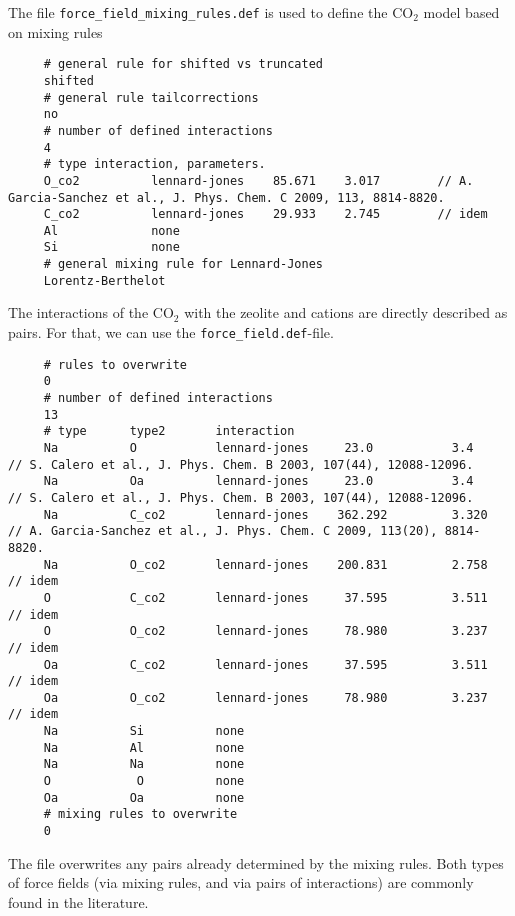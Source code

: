 \noindent
The file \verb+force_field_mixing_rules.def+ is used to define the CO$_2$ model based on mixing rules
\begin{tiny}
\begin{verbatim}
     # general rule for shifted vs truncated
     shifted
     # general rule tailcorrections
     no
     # number of defined interactions
     4
     # type interaction, parameters.
     O_co2          lennard-jones    85.671    3.017        // A. Garcia-Sanchez et al., J. Phys. Chem. C 2009, 113, 8814-8820.
     C_co2          lennard-jones    29.933    2.745        // idem
     Al             none
     Si             none
     # general mixing rule for Lennard-Jones
     Lorentz-Berthelot
\end{verbatim}
\end{tiny}
The interactions of the CO$_2$ with the zeolite and cations are directly described as pairs.
For that, we can use the \verb+force_field.def+-file.
\begin{tiny}
\begin{verbatim}
     # rules to overwrite
     0
     # number of defined interactions
     13
     # type      type2       interaction
     Na          O           lennard-jones     23.0           3.4        // S. Calero et al., J. Phys. Chem. B 2003, 107(44), 12088-12096.
     Na          Oa          lennard-jones     23.0           3.4        // S. Calero et al., J. Phys. Chem. B 2003, 107(44), 12088-12096.
     Na          C_co2       lennard-jones    362.292         3.320      // A. Garcia-Sanchez et al., J. Phys. Chem. C 2009, 113(20), 8814-8820.
     Na          O_co2       lennard-jones    200.831         2.758      // idem
     O           C_co2       lennard-jones     37.595         3.511      // idem
     O           O_co2       lennard-jones     78.980         3.237      // idem
     Oa          C_co2       lennard-jones     37.595         3.511      // idem
     Oa          O_co2       lennard-jones     78.980         3.237      // idem
     Na          Si          none
     Na          Al          none
     Na          Na          none
     O            O          none
     Oa          Oa          none
     # mixing rules to overwrite
     0
\end{verbatim}
\end{tiny}
The file overwrites any pairs already determined by the mixing rules. Both types of force fields (via mixing rules, and via pairs of interactions)
are commonly found in the literature.

